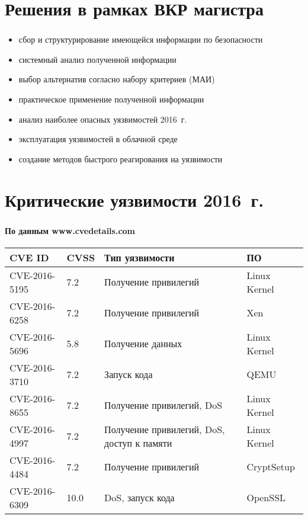 
\section{Решения в рамках ВКР магистра}

\begin{frame}
\frametitle{\insertsection}

\begin{itemize}
    \item сбор и структурирование имеющейся информации по безопасности
    \item системный анализ полученной информации
    \item выбор альтернатив согласно набору критериев (МАИ)
    \item практическое применение полученной информации
    \item анализ наиболее опасных уязвимостей 2016~г.
    \item эксплуатация уязвимостей в облачной среде
    \item создание методов быстрого реагирования на уязвимости
\end{itemize}
\end{frame}


\section{Критические уязвимости 2016~г.}

\begin{frame}
\frametitle{\insertsection}
\framesubtitle{По данным www.cvedetails.com}

\begin{table}
    \begin{tabular}{|l|l|p{4cm}|l|}
        \hline \textbf{CVE ID} & \textbf{CVSS} & \textbf{Тип уязвимости} & \textbf{ПО} \\
        \hline CVE-2016-5195 & 7.2 & Получение привилегий & Linux Kernel \\
        \hline CVE-2016-6258 & 7.2 & Получение привилегий & Xen \\
        \hline CVE-2016-5696 & 5.8 & Получение данных & Linux Kernel \\
        \hline CVE-2016-3710 & 7.2 & Запуск кода & QEMU \\
        \hline CVE-2016-8655 & 7.2 & Получение привилегий, DoS & Linux Kernel \\
        \hline CVE-2016-4997 & 7.2 & Получение привилегий, DoS, доступ к памяти & Linux Kernel \\
        \hline CVE-2016-4484 & 7.2 & Получение привилегий & CryptSetup \\
        \hline CVE-2016-6309 & 10.0 & DoS, запуск кода & OpenSSL\\
        \hline
    \end{tabular}
\end{table}
\end{frame}

